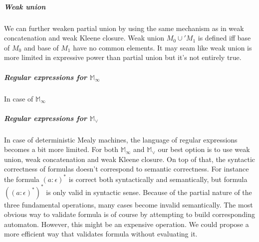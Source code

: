 \documentclass[12pt]{article}
\begin{document}
\subparagraph{Weak union} We can further weaken partial union by using the same mechanism as in weak concatenation and weak Kleene closure. Weak union $M_0 \cup' M_1$ is defined iff base of $M_0$ and base of $M_1$ have no common elements. It may seam like weak union is more limited in expressive power than partial union but it's not entirely true.

\subparagraph{Regular expressions for $\mathbb{ M}_\infty$} In case of $\mathbb{ M}_\infty$ 


\subparagraph{Regular expressions for $\mathbb{ M}_\vee$} In case of deterministic Mealy machines, the language of regular expressions becomes a bit more limited. For both $\mathbb{M}_\infty$ and $\mathbb{M}_\vee$ our best option is to use weak union, weak concatenation and weak Kleene closure. On top of that, the syntactic correctness of formulas doesn't correspond to semantic correctness. For instance the formula $(a:\epsilon)^*$ is correct both syntactically and semantically, but formula $((a:\epsilon)^*)^*$ is only valid in syntactic sense. Because of the partial nature of the three fundamental operations, many cases become invalid semantically. The most obvious way to validate formula is of course by attempting to build corresponding automaton. However, this might be an expensive operation. We could propose a more efficient way that validates formula without evaluating it.
\end{document}
